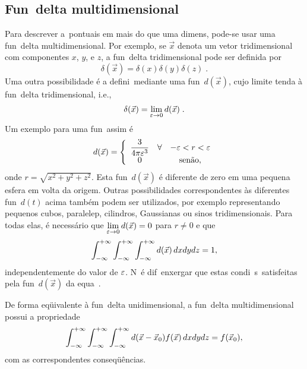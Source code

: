 \subsection{Fun\cao\ delta multidimensional}

Para descrever a\coes\ pontuais em mais do que uma dimens\ao, pode-se
usar uma fun\cao\ delta multidimensional. Por exemplo, se $\vec x$
denota um vetor tridimensional com componentes $x$, $y$, e $z$, a
fun\cao\ delta tridimensional pode ser definida por
\begin{equation}
\delta(\vec x) = \delta(x)\delta(y)\delta(z) \; .
\label{eq:delmul}
\end{equation}
Uma outra possibilidade \'e a defini\cao\ mediante uma fun\cao\
$d(\vec{x})$, cujo limite tenda \`a fun\cao\ delta tridimensional, i.e.,
\begin{equation}
\delta(\vec x) = \lim_{\varepsilon\to0} d(\vec x) \; .
\label{eq:del3d}
\end{equation}
Um exemplo para uma fun\cao\ assim \'e
\begin{equation}
d(\vec x) = \left\{ \begin{array}{ccc}
\displaystyle \frac{3}{4\pi\varepsilon^3} & \forall & -\varepsilon < r < \varepsilon \\
0 && \mbox{sen\~ao},
\end{array}
\right.
\label{eq:dt3d}
\end{equation}
onde $r=\sqrt{x^2+y^2+z^2}$. Esta fun\cao\ $d(\vec{x})$ \'e diferente de
zero em uma pequena esfera em volta da origem. Outras possibilidades
correspondentes \`as diferentes fun\coes\ $d(t)$ acima tamb\'em podem
ser utilizados, por exemplo representando pequenos cubos,
paralelep\ipedos, cilindros, Gaussianas ou sinos tridimensionais. Para
todas elas, \'e necess\'ario que $\displaystyle \lim_{\varepsilon\to0} d(\vec
x) = 0$ para $r\neq0$ e que
\begin{equation}
\int_{-\infty}^{+\infty} \int_{-\infty}^{+\infty} \int_{-\infty}^{+\infty} d(\vec x) \, dxdydz = 1,
\label{eq:volum}
\end{equation}
independentemente do valor de $\varepsilon$. N\ao\ \'e dif\icil\ enxergar que
estas condi\coes\ s\ao\ satisfeitas pela fun\cao\ $d(\vec{x})$ da
equa\cao\ \refi{eq:dt3d}.

De forma eq\"uivalente \`a fun\cao\ delta unidimensional, a fun\cao\ delta
multidimensional possui a propriedade 
\begin{equation}
\int_{-\infty}^{+\infty} \int_{-\infty}^{+\infty} \int_{-\infty}^{+\infty} d(\vec x-\vec x_0) f(\vec x) \, dxdydz = f(\vec x_0),
\label{eq:samp3d}
\end{equation}
com as correspondentes conseq\"u\^encias.
